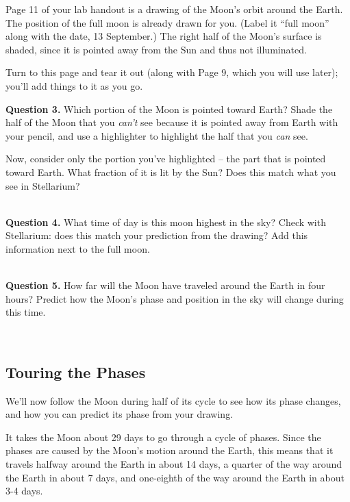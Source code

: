 \documentclass[11pt]{article}
\begin{document}
\newpage


Page 11 of your lab handout is a drawing of the Moon's orbit around the Earth. The position 
of the full moon is already drawn for you. (Label it ``full moon'' along with the date, 13 September.) The right half of the Moon's surface is shaded, since it is pointed away from the Sun and thus not illuminated.

Turn to this page and tear it out (along with Page 9, which you will use later); you'll add things to it as you go.\vspace{1cm}

\textbf{Question 3.} Which portion of the Moon is pointed toward Earth? Shade the half of the Moon that you {\it can't}
see because it is pointed away from Earth with your pencil, and use a highlighter to highlight the half that you {\it can} see.

Now, consider only the portion you've highlighted -- the part that is pointed toward Earth. What fraction of it is lit 
by the Sun? Does this match what you see in Stellarium?

\vspace*{1.5cm}

\hrulefill\\

\textbf{Question 4.} What time of day is this moon highest in the sky? Check with Stellarium: does this match your 
prediction from the drawing? Add this information next to the full moon.

\vspace*{1.5cm}

\hrulefill\\

\textbf{Question 5.} How far will the Moon have traveled around the Earth in four hours? Predict how the Moon's phase and position
in the sky will change during this time. 

\vspace*{1.5cm}

\hrulefill\\


\subsection{Touring the Phases}


We'll now follow the Moon during half of its cycle to see how its phase changes, and how you can predict its phase from your drawing.

It takes the Moon about 29 days to go through a cycle of phases. Since the phases are caused by the Moon's motion around the Earth,
this means that it travels halfway around the Earth in about 14 days, a quarter of the way around the Earth in about 7 days, and one-eighth of the way around the Earth in about 3-4 days.
\end{document}
